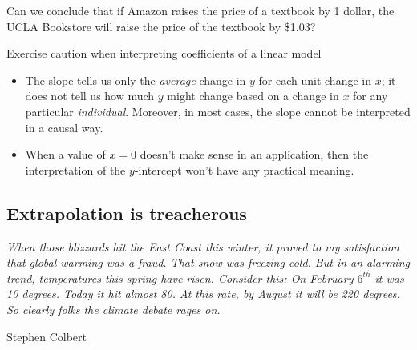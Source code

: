 \begin{exercisewrap}
\begin{nexercise}
Can we conclude that if Amazon raises the price of a textbook by 1 dollar, the UCLA Bookstore will raise the price of the textbook by \$1.03?\footnotemark
\end{nexercise}
\end{exercisewrap}

\begin{onebox}{Exercise caution when interpreting coefficients of a linear model}
\vspace{-4mm}
\begin{itemize}
\setlength{\itemsep}{0mm}
\item The slope tells us only the \emph{average} change in $y$ for each unit change in $x$; it does not tell us how much $y$ might change based on a change in $x$ for any particular \emph{individual}.  Moreover, in most cases, the slope cannot be interpreted in a causal way.
\item When a value of $x=0$ doesn't make sense in an application, then the interpretation of the $y$-intercept won't have any practical meaning.  
\end{itemize}
\end{onebox}


\subsection{Extrapolation is treacherous}

{\em\small When those blizzards hit the East Coast this winter, it proved to my satisfaction that global warming was a fraud. That snow was freezing cold. But in an alarming trend, temperatures this spring have risen. Consider this: On February $6^{th}$ it was 10 degrees. Today it hit almost 80. At this rate, by August it will be 220 degrees. So clearly folks the climate debate rages on.\vspace{0.5mm}}

\noindent\hspace{\textwidth}\hspace{-40mm}Stephen Colbert

